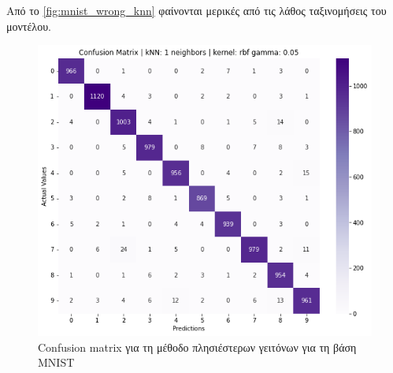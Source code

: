 \documentclass[a4paper]{article}
\begin{document}
Από το \autoref{fig:mnist_wrong_knn} φαίνονται μερικές από τις λάθος ταξινομήσεις
του μοντέλου.

\begin{figure}[H]
    \centering
    \includegraphics[width=0.6\linewidth]{mnist/confusion_matrix_knn.png}
    \caption{Confusion matrix για τη μέθοδο πλησιέστερων γειτόνων για τη βάση
    MNIST}
    \label{fig:mnist_confusion_knn}
\end{figure}
\end{document}
